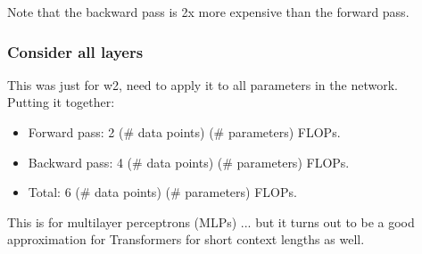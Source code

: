 \documentclass[12pt,twoside]{article}
\begin{document}
Note that the backward pass is 2x more expensive than the forward pass.

\subsubsection*{Consider all layers}

This was just for w2, need to apply it to all parameters in the network. \\

Putting it together:

\begin{itemize}
    \item Forward pass: 2 (\# data points) (\# parameters) FLOPs.
    \item Backward pass: 4 (\# data points) (\# parameters) FLOPs.
    \item Total: 6 (\# data points) (\# parameters) FLOPs.
\end{itemize}

This is for multilayer perceptrons (MLPs) ... but it turns out to be a good approximation for Transformers for short context lengths as well.
\end{document}
